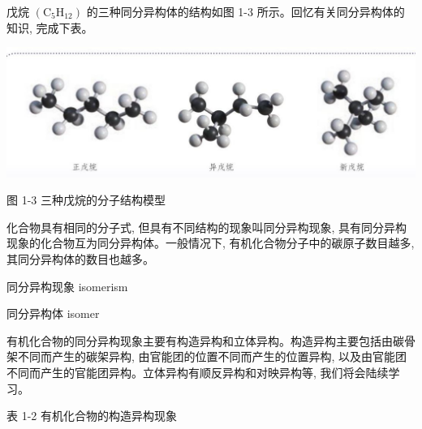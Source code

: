 \documentclass[10pt]{article}
\begin{document}
戊烷 \(\left( {{\mathrm{C}}_{5}{\mathrm{H}}_{12}}\right)\) 的三种同分异构体的结构如图 1-3 所示。回忆有关同分异构体的知识, 完成下表。

\begin{center}
\end{center}

\begin{center}
\includegraphics[max width=1.0\textwidth]{images/0190efc5-b58a-7c43-bfb0-e0a030df9cfd_14_431306.jpg}
\end{center}

图 1-3 三种戊烷的分子结构模型

化合物具有相同的分子式, 但具有不同结构的现象叫同分异构现象, 具有同分异构现象的化合物互为同分异构体。一般情况下, 有机化合物分子中的碳原子数目越多, 其同分异构体的数目也越多。

\begin{mdframed}

同分异构现象 isomerism

同分异构体 isomer

\end{mdframed}

有机化合物的同分异构现象主要有构造异构和立体异构。构造异构主要包括由碳骨架不同而产生的碳架异构, 由官能团的位置不同而产生的位置异构, 以及由官能团不同而产生的官能团异构。立体异构有顺反异构和对映异构等, 我们将会陆续学习。

表 1-2 有机化合物的构造异构现象
\end{document}
